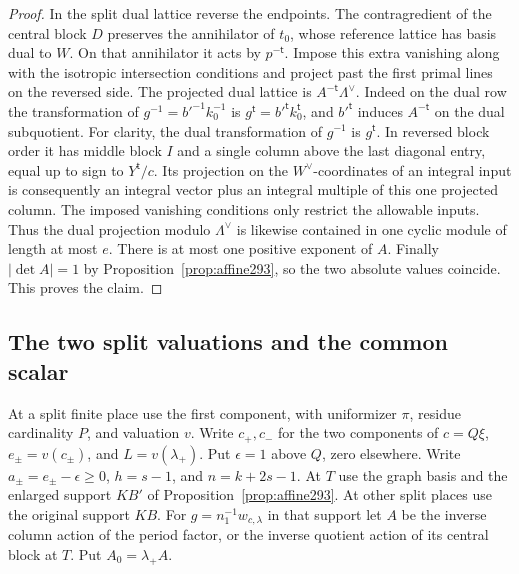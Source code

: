 \documentclass[a4paper,11pt]{article}
\theoremstyle{definition}
\theoremstyle{remark}
\numberwithin{equation}{section}
\begin{document}
\begin{proof}
In the split dual lattice reverse the endpoints. The
contragredient of the central block \(D\) preserves the
annihilator of \(t_0\), whose reference lattice has basis
dual to \(W\). On that annihilator it acts by \(p^{-{\mathsf t}}\).
Impose this extra vanishing along with the isotropic
intersection conditions and project past the first primal
lines on the reversed side. The projected dual lattice is
\(A^{-{\mathsf t}}\Lambda^\vee\). Indeed on the dual
row the transformation of \(g^{-1}=b'^{-1}k_0^{-1}\)
is \(g^{\mathsf t}=b'^{\mathsf t}k_0^{\mathsf t}\),
and \(b'^{\mathsf t}\) induces \(A^{-{\mathsf t}}\)
on the dual subquotient.
For clarity, the dual transformation of \(g^{-1}\) is
\(g^{\mathsf t}\). In reversed block order it has middle
block \(I\) and a single column above the last diagonal
entry, equal up to sign to \(Y^{\mathsf t}/c\). Its
projection on the \(W^\vee\)-coordinates of an integral
input is consequently an integral vector plus an integral
multiple of this one projected column. The imposed
vanishing conditions only restrict the allowable inputs.
Thus the dual projection modulo \(\Lambda^\vee\) is
likewise contained in one cyclic module of length at
most \(e\). There is at most one positive exponent of
\(A\). Finally \(|\det A|=1\) by
Proposition~\ref{prop:affine293}, so the two absolute
values coincide. This proves the claim.
\end{proof}

\subsection{The two split valuations and the common scalar}\label{nav:IV-51}
At a split finite place use the first component, with
uniformizer \(\pi\), residue cardinality \(P\), and
valuation \(v\). Write \(c_+,c_-\) for the two components
of \(c=Q\xi\), \(e_\pm=v(c_\pm)\), and \(L=v(\lambda_+)\).
Put \(\epsilon=1\) above \(Q\), zero elsewhere. Write
\(a_\pm=e_\pm-\epsilon\ge0\), \(h=s-1\), and
\(n=k+2s-1\). At \(T\) use the graph basis and the enlarged
support \(KB'\) of Proposition~\ref{prop:affine293}. At
other split places use the original support \(KB\). For
\(g=n_1^{-1}w_{c,\lambda}\) in that support let \(A\) be
the inverse column action of the period factor, or the
inverse quotient action of its central block at \(T\).
Put \(A_0=\lambda_+ A\).
\end{document}
